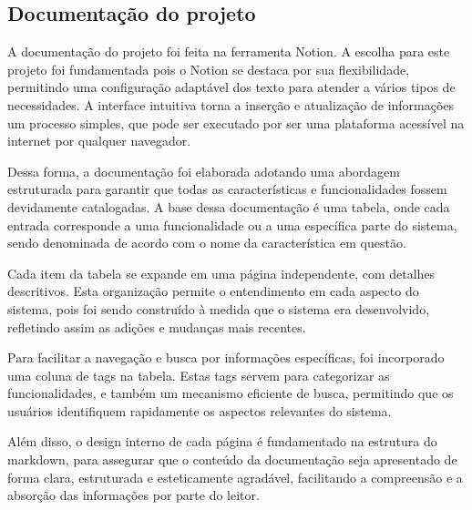 


\subsection{Documentação do projeto}\label{sec:documentation}
A documentação do projeto foi feita na ferramenta Notion. A escolha para este projeto foi fundamentada pois o Notion se destaca por sua flexibilidade, permitindo uma configuração adaptável dos texto para atender a vários tipos de necessidades. A interface intuitiva torna a inserção e atualização de informações um processo simples, que pode ser executado por ser uma plataforma acessível na internet por qualquer navegador.

Dessa forma, a documentação foi elaborada adotando uma abordagem estruturada para garantir que todas as características e funcionalidades fossem devidamente catalogadas. A base dessa documentação é uma tabela, onde cada entrada corresponde a uma funcionalidade ou a uma específica parte do sistema, sendo denominada de acordo com o nome da característica em questão.

Cada item da tabela se expande em uma página independente, com detalhes descritivos. Esta organização permite o entendimento em cada aspecto do sistema, pois foi sendo construído à medida que o sistema era desenvolvido, refletindo assim as adições e mudanças mais recentes.

Para facilitar a navegação e busca por informações específicas, foi incorporado uma coluna de tags na tabela. Estas tags servem para categorizar as funcionalidades, e também um mecanismo eficiente de busca, permitindo que os usuários identifiquem rapidamente os aspectos relevantes do sistema.

Além disso, o design interno de cada página é fundamentado na estrutura do markdown, para assegurar que o conteúdo da documentação seja apresentado de forma clara, estruturada e esteticamente agradável, facilitando a compreensão e a absorção das informações por parte do leitor.

